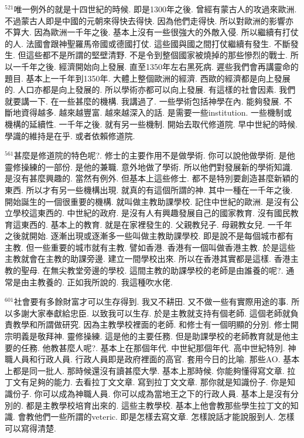 \documentclass{book}
\begin{document}
$^{521}$唯一例外的就是十四世紀的時候.
即是1300年之後.
曾經有蒙古人的攻過來歐洲.
不過蒙古人即是中國的元朝來得快去得快.
因為他們走得快.
所以對歐洲的影響亦不算大.
因為歐洲一千年之後.
基本上沒有一些很強大的外敵入侵.
所以繼續有打仗的人.
法國會跟神聖羅馬帝國或德國打仗.
這些國與國之間打仗繼續有發生.
不斷發生.
但這些都不是所謂的堅壁清野.
不是令到整個國家被燒掉的那些慘烈的戰士.
所以一千年之後.
經濟開始向上發展.
直至1350年左右黑死病.
遲些我們會再講靈命的題目.
基本上一千年到1350年.
大體上整個歐洲的經濟.
西歐的經濟都是向上發展的.
人口亦都是向上發展的.
所以學術亦都可以向上發展.
有這樣的社會因素.
我們就要講一下.
在一些甚麼的機構.
我講過了.
一些學術包括神學在內.
能夠發展.
不斷地資得越多.
越來越豐富.
越來越深入的話.
是需要一些institution.
一些機制或機構的延續性.
一千年之後.
就有另一些機制.
開始去取代修道院.
早中世紀的時候.
學識的維持是在乎.
或者依賴修道院.

$^{561}$甚麼是修道院的特色呢?.
修士的主要作用不是做學術.
你可以說他做學術.
是他靈修操練的一部份.
是他的兼職.
意外地做了學術.
所以他們對發展新的學術知識.
是沒有甚麼興趣的.
當然有例外.
但基本上這些修士.
都不是特別要創造甚麼新穎的東西.
所以才有另一些機構出現.
就真的有這個所謂的神.
其中一種在一千年之後.
開始誕生的一個很重要的機構.
就叫做主教助課學校.
記住中世紀的歐洲.
是沒有公立學校這東西的.
中世紀的政府.
是沒有人有興趣發展自己的國家教育.
沒有國民教育這東西的.
基本上的教育.
就是在家裡發生的.
父親教兒子.
母親教女兒.
一千年之後就開始.
逐漸出現或逐漸多一些叫做主教助課學校.
即是說不是每個城市都有主教.
但一些重要的城市就有主教.
譬如香港.
香港有一個叫做香港主教.
於是這些主教就會在主教的助課旁邊.
建立一間學校出來.
所以在香港其實都是這樣.
香港主教的聖母.
在無尖教堂旁邊的學校.
這間主教的助課學校的老師是由誰養的呢?.
通常是由主教養的.
正如我所說的.
我這種吹水佬.

$^{601}$社會要有多餘財富才可以生存得到.
我又不耕田.
又不做一些有實際用途的事.
所以多謝大家奉獻給忠臣.
以致我可以生存.
於是主教就支持有個老師.
這個老師就負責教學和所謂做研究.
因為主教學校裡面的老師.
和修士有一個明顯的分別.
修士開宗明義是敬拜神.
靈修操練.
這是他的主要任務.
但是助課學校的老師教育就是他主要的任務.
他教甚麼人呢?.
基本上在那個年代.
中世紀那個年代.
高中世紀特別.
神職人員和行政人員.
行政人員即是政府裡面的高官.
套用今日的比喻.
那些AO.
基本上都是同一批人.
那時候還沒有讀甚麼大學.
基本上那時候.
你能夠懂得寫文章.
拉丁文有足夠的能力.
去看拉丁文文章.
寫到拉丁文文章.
那你就是知識份子.
你是知識份子.
你可以成為神職人員.
你可以成為當地王之下的行政人員.
基本上是沒有分別的.
都是主教學校培育出來的.
這些主教學校.
基本上他會教那些學生拉丁文的知識.
會教他們一些所謂的veteric.
即是怎樣去寫文章.
怎樣說話才能說服到人.
怎樣可以寫得清楚.
\end{document}
